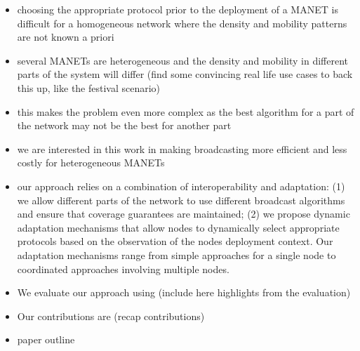 {\begin{itemize}
	\item choosing the appropriate protocol prior to the deployment of a MANET is difficult for a homogeneous network where the density and mobility patterns are not known a priori
	\item several MANETs are heterogeneous \cite{Camp2002,bai2004mobility,Ramdhany2008} %
	and the density and mobility in different parts of the system will differ (find some convincing real life use cases to back this up, like the festival scenario)
	\item this makes the problem even more complex as the best algorithm for a part of the network may not be the best for another part
	\item we are interested in this work in making broadcasting more efficient and less costly for heterogeneous MANETs
	\item our approach relies on a combination of interoperability and adaptation: (1) we allow different parts of the network to use different broadcast algorithms and ensure that coverage guarantees are maintained; (2) we propose dynamic adaptation mechanisms that allow nodes to dynamically select appropriate protocols based on the observation of the nodes deployment context. Our adaptation mechanisms range from simple approaches for a single node to coordinated approaches involving multiple nodes.
	\item We evaluate our approach using (include here highlights from the evaluation)
	\item Our contributions are (recap contributions)
	\item paper outline
\end{itemize}
}
